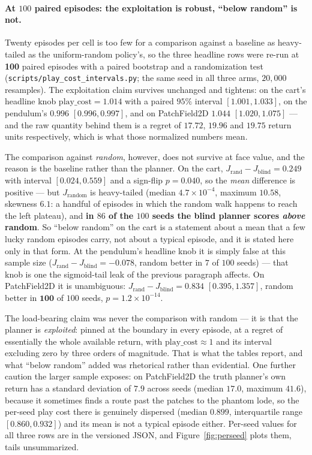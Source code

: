 \documentclass[11pt]{article}
\theoremstyle{definition}
\theoremstyle{remark}
\begin{document}
\paragraph{At $100$ paired episodes: the exploitation is robust, ``below random'' is not.} Twenty episodes per cell is too few for a comparison against a baseline as heavy-tailed as the uniform-random policy's, so the three headline rows were re-run at \textbf{100} paired episodes with a paired bootstrap and a randomization test (\texttt{scripts/\allowbreak play\_\allowbreak cost\_\allowbreak intervals.py}; the same seed in all three arms, $20{,}000$ resamples). The exploitation claim survives unchanged and tightens: on the cart's headline knob $\mathrm{play\_cost} = 1.014$ with a paired $95\%$ interval $[1.001, 1.033]$, on the pendulum's $0.996$ $[0.996, 0.997]$, and on PatchField2D $1.044$ $[1.020, 1.075]$ --- and the raw quantity behind them is a regret of $17.72$, $19.96$ and $19.75$ return units respectively, which is what those normalized numbers mean.

The comparison against \emph{random}, however, does not survive at face value, and the reason is the baseline rather than the planner. On the cart, $J_{\mathrm{rand}} - J_{\mathrm{blind}} = 0.249$ with interval $[0.024, 0.559]$ and a sign-flip $p = 0.040$, so the \emph{mean} difference is positive --- but $J_{\mathrm{random}}$ is heavy-tailed (median $4.7\times10^{-4}$, maximum $10.58$, skewness $6.1$: a handful of episodes in which the random walk happens to reach the left plateau), and \textbf{in $86$ of the $100$ seeds the blind planner scores \emph{above} random}. So ``below random'' on the cart is a statement about a mean that a few lucky random episodes carry, not about a typical episode, and it is stated here only in that form. At the pendulum's headline knob it is simply false at this sample size ($J_{\mathrm{rand}} - J_{\mathrm{blind}} = -0.078$, random better in $7$ of $100$ seeds) --- that knob is one the sigmoid-tail leak of the previous paragraph affects. On PatchField2D it is unambiguous: $J_{\mathrm{rand}} - J_{\mathrm{blind}} = 0.834$ $[0.395, 1.357]$, random better in $\mathbf{100}$ of $100$ seeds, $p = 1.2\times10^{-14}$.

The load-bearing claim was never the comparison with random --- it is that the planner is \emph{exploited}: pinned at the boundary in every episode, at a regret of essentially the whole available return, with $\mathrm{play\_cost} \approx 1$ and its interval excluding zero by three orders of magnitude. That is what the tables report, and what ``below random'' added was rhetorical rather than evidential. One further caution the larger sample exposes: on PatchField2D the truth planner's own return has a standard deviation of $7.9$ across seeds (median $17.0$, maximum $41.6$), because it sometimes finds a route past the patches to the phantom lode, so the per-seed play cost there is genuinely dispersed (median $0.899$, interquartile range $[0.860, 0.932]$) and its mean is not a typical episode either. Per-seed values for all three rows are in the versioned JSON, and Figure~\ref{fig:perseed} plots them, tails unsummarized.
\end{document}

